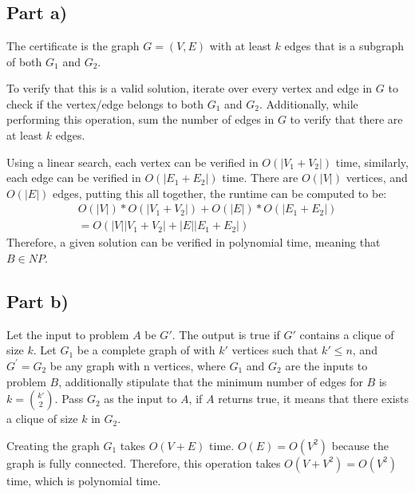 \section{}

\subsection*{Part a)}

The certificate is the graph $G=(V,E)$ with at least $k$ edges that is a subgraph of both $G_1$ and $G_2$.

To verify that this is a valid solution, iterate over every vertex and edge in $G$ to check if the vertex/edge belongs to both $G_1$ and $G_2$. Additionally, while performing this operation, sum the number of edges in $G$ to verify that there are at least $k$ edges.

Using a linear search, each vertex can be verified in $O\left(\left|V_1+V_2\right|\right)$ time, similarly, each edge can be verified in $O\left(\left|E_1+E_2\right|\right)$ time. There are $O\left(\left|V\right|\right)$ vertices, and $O\left(\left|E\right|\right)$ edges, putting this all together, the runtime can be computed to be:
\begin{eqnarray}
    O\left(\left|V\right|\right)\ast O\left(\left|V_1+V_2\right|\right)+O\left(\left|E\right|\right)\ast O\left(\left|E_1+E_2\right|\right) \\
    =O(\left|V\right|\left|V_1+V_2\right|+\left|E\right|\left|E_1+E_2\right|)
\end{eqnarray}
Therefore, a given solution can be verified in polynomial time, meaning that $B \in NP$.

\subsection*{Part b)}

Let the input to problem $A$ be $G'$. The output is true if $G'$ contains a clique of size $k$. Let $G_1$ be a complete graph of with $k'$ vertices such that $k\prime\le n$, and $G^\prime=G_2$ be any graph with n vertices, where $G_1$  and $G_2$ are the inputs to problem $B$, additionally stipulate that the minimum number of edges for $B$ is $k=\binom{k\prime}{2}$. Pass $G_2$ as the input to $A$, if $A$ returns true, it means that there exists a clique of size $k$ in $G_2$.

Creating the graph $G_1$ takes $O\left(V+E\right)$ time. $O\left(E\right)=O(V^2)$ because the graph is fully connected. Therefore, this operation takes $O\left(V+V^2\right)=O\left(V^2\right)$ time, which is polynomial time.


